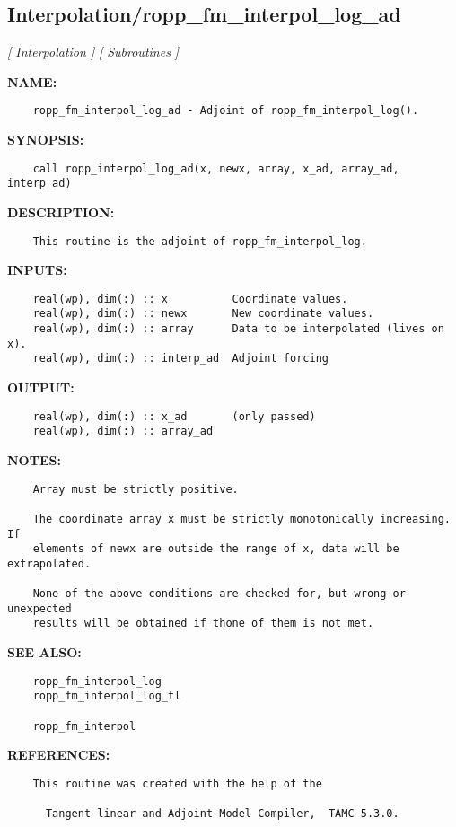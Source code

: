 \subsection{Interpolation/ropp\_fm\_interpol\_log\_ad}
\textsl{[ Interpolation ]}
\textsl{[ Subroutines ]}

\label{ch:robo52}
\label{ch:Interpolation_ropp_fm_interpol_log_ad}
\textbf{NAME:}\hspace{0.08in}\begin{Verbatim}
    ropp_fm_interpol_log_ad - Adjoint of ropp_fm_interpol_log().
\end{Verbatim}
\textbf{SYNOPSIS:}\hspace{0.08in}\begin{Verbatim}
    call ropp_interpol_log_ad(x, newx, array, x_ad, array_ad, interp_ad)
\end{Verbatim}
\textbf{DESCRIPTION:}\hspace{0.08in}\begin{Verbatim}
    This routine is the adjoint of ropp_fm_interpol_log.
\end{Verbatim}
\textbf{INPUTS:}\hspace{0.08in}\begin{Verbatim}
    real(wp), dim(:) :: x          Coordinate values.
    real(wp), dim(:) :: newx       New coordinate values.
    real(wp), dim(:) :: array      Data to be interpolated (lives on x).
    real(wp), dim(:) :: interp_ad  Adjoint forcing
\end{Verbatim}
\textbf{OUTPUT:}\hspace{0.08in}\begin{Verbatim}
    real(wp), dim(:) :: x_ad       (only passed)
    real(wp), dim(:) :: array_ad
\end{Verbatim}
\textbf{NOTES:}\hspace{0.08in}\begin{Verbatim}
    Array must be strictly positive.

    The coordinate array x must be strictly monotonically increasing. If
    elements of newx are outside the range of x, data will be extrapolated.

    None of the above conditions are checked for, but wrong or unexpected
    results will be obtained if thone of them is not met. 
\end{Verbatim}
\textbf{SEE ALSO:}\hspace{0.08in}\begin{Verbatim}
    ropp_fm_interpol_log
    ropp_fm_interpol_log_tl

    ropp_fm_interpol
\end{Verbatim}
\textbf{REFERENCES:}\hspace{0.08in}\begin{Verbatim}
    This routine was created with the help of the 

      Tangent linear and Adjoint Model Compiler,  TAMC 5.3.0.
\end{Verbatim}
